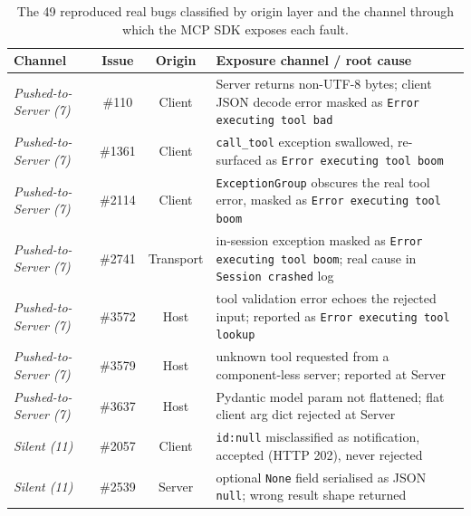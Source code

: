 \begin{table}[!t]
\centering
\caption{The 49 reproduced real bugs classified by origin layer and the channel through which the MCP SDK exposes each fault.}
\label{tab:repro49}
\scriptsize
\renewcommand{\arraystretch}{1.03}
\setlength{\tabcolsep}{1.25pt}
\begin{tabularx}{\textwidth}{@{}>{\centering\arraybackslash}X{} >{\centering\arraybackslash}c >{\centering\arraybackslash}c >{\arraybackslash}X{}@{}}
\toprule
\textbf{Channel} & \textbf{Issue} & \textbf{Origin} & \textbf{Exposure channel / root cause} \\
\midrule
\emph{Pushed-to-Server (7)} & \#110 & Client & Server returns non-UTF-8 bytes; client JSON decode error masked as \texttt{Error executing tool bad} \\
\emph{Pushed-to-Server (7)} & \#1361 & Client & \texttt{call\_tool} exception swallowed, re-surfaced as \texttt{Error executing tool boom} \\
\emph{Pushed-to-Server (7)} & \#2114 & Client & \texttt{ExceptionGroup} obscures the real tool error, masked as \texttt{Error executing tool boom} \\
\emph{Pushed-to-Server (7)} & \#2741 & Transport & in-session exception masked as \texttt{Error executing tool boom}; real cause in \texttt{Session crashed} log \\
\emph{Pushed-to-Server (7)} & \#3572 & Host & tool validation error echoes the rejected input; reported as \texttt{Error executing tool lookup} \\
\emph{Pushed-to-Server (7)} & \#3579 & Host & unknown tool requested from a component-less server; reported at Server \\
\emph{Pushed-to-Server (7)} & \#3637 & Host & Pydantic model param not flattened; flat client arg dict rejected at Server \\
\midrule
\emph{Silent (11)} & \#2057 & Client & \texttt{id:null} misclassified as notification, accepted (HTTP 202), never rejected \\
\emph{Silent (11)} & \#2539 & Server & optional \texttt{None} field serialised as JSON \texttt{null}; wrong result shape returned \\

\end{tabularx}
\end{table}
